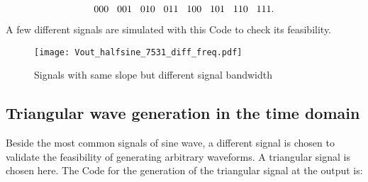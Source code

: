 \begin{equation}
 000\hspace{.3cm} 001\hspace{.3cm} 010\hspace{.3cm} 011\hspace{.3cm} 100\hspace{.3cm} 101\hspace{.3cm} 110\hspace{.3cm} 111.
\end{equation}
\label{eq:RiemannCodeRectSine}

A few different signals are simulated with this Code to check its feasibility.


\begin{figure}[htb!]
	\centering
  \texttt{[image: Vout\_halfsine\_7531\_diff\_freq.pdf]}
	\caption{Signals with same slope but different signal bandwidth}
	\label{fig:DiffSigBWSameSlope}
\end{figure}





\subsection{Triangular wave generation in the time domain}
Beside the most common signals of sine wave, a different signal is chosen to validate the feasibility of generating arbitrary waveforms.
A triangular signal is chosen here.
The Code for the generation of the triangular signal at the output is:

